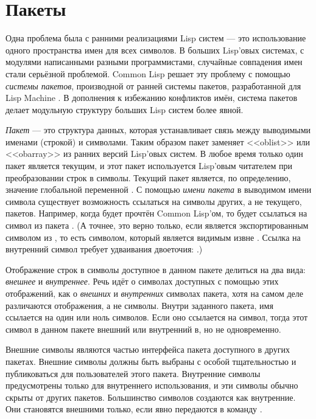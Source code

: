 \else

\chapter{Пакеты}
\label{XPACK}

Одна проблема была с ранними реализациями Lisp систем --- это использование
одного пространства имен для всех символов. В больших Lisp'овых системах, с
модулями написанными разными программистами, случайные совпадения имен стали
серьёзной проблемой. Common Lisp решает эту проблему с помощью \emph{системы
  пакетов}, производной от ранней системы пакетов, разработанной для Lisp
Machine \cite{BLUE-LISPM}.
В дополнения к избежанию конфликтов имён, система пакетов делает модульную
структуру больших Lisp систем более явной.

\emph{Пакет} --- это структура данных, которая устанавливает связь между
выводимыми именами (строкой) и символами. Таким образом пакет заменяет
<<oblist>> или <<obarray>> из ранних версий Lisp'овых систем. В любое время
только один пакет является текущим, и этот пакет используется Lisp'овым
читателем при преобразовании строк в символы. Текущий пакет является, по
определению, значение глобальной переменной . С помощью
\emph{имени пакета} в выводимом имени символа существует возможность
ссылаться на символы других, а не текущего, пакетов.
Например, когда  будет прочтён Common Lisp'ом, то будет ссылаться на
символ  из пакета .
(А точнее, это верно только, если  является экспортированным символом из
, то есть символом, который является видимым извне . Ссылка на
внутренний символ требует удваивания двоеточия: .)

Отображение строк в символы доступное в данном пакете делиться на два вида:
\emph{внешнее} и \emph{внутреннее}. Речь идёт о символах доступных с помощью
этих отображений, как о \emph{внешних} и \emph{внутренних} символах пакета, хотя
на самом деле различаются отображения, а не символы.
Внутри заданного пакета, имя ссылается на один или ноль символов. Если оно
ссылается на символ, тогда этот символ в данном пакете внешний или внутренний в,
но не одновременно. 

Внешние символы являются частью интерфейса пакета доступного в других
пакетах. Внешние символы должны быть выбраны с особой тщательностью и
публиковаться для пользователей этого пакета. Внутренние символы
предусмотрены только для внутреннего использования, и эти символы обычно скрыты
от других пакетов. Большинство символов создаются как внутренние. Они становятся
внешними только, если явно передаются в команду .

